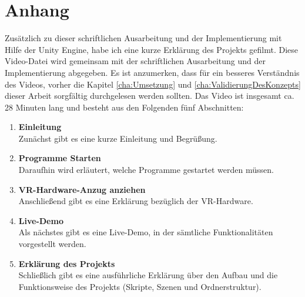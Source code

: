 \chapter*{Anhang} \label{cha:Anhang}

Zusätzlich zu dieser schriftlichen Ausarbeitung und der Implementierung mit Hilfe der Unity Engine, habe ich eine kurze Erklärung des Projekts gefilmt. Diese Video-Datei wird gemeinsam mit der schriftlichen Ausarbeitung und der Implementierung abgegeben. Es ist anzumerken, dass für ein besseres Verständnis des Videos, vorher die Kapitel \ref{cha:Umsetzung} und \ref{cha:ValidierungDesKonzepts} dieser Arbeit sorgfältig durchgelesen werden sollten. Das Video ist insgesamt ca. 28 Minuten lang und besteht aus den Folgenden fünf Abschnitten:
\begin{enumerate}
	\item \textbf{Einleitung} \\
	Zunächst gibt es eine kurze Einleitung und Begrüßung.
	\item \textbf{Programme Starten} \\
	Daraufhin wird erläutert, welche Programme gestartet werden müssen.
	\item \textbf{VR-Hardware-Anzug anziehen} \\
	Anschließend gibt es eine Erklärung bezüglich der VR-Hardware.
	\item \textbf{Live-Demo} \\
	Als nächstes gibt es eine Live-Demo, in der sämtliche Funktionalitäten vorgestellt werden.
	\item \textbf{Erklärung des Projekts} \\
	Schließlich gibt es eine ausführliche Erklärung über den Aufbau und die Funktionsweise des Projekts (Skripte, Szenen und Ordnerstruktur).
\end{enumerate}
